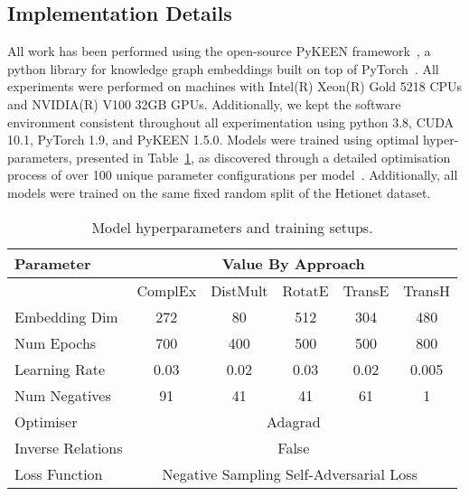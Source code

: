 \subsection{Implementation Details}

All work has been performed using the open-source PyKEEN framework~\cite{ali2020pykeen}, a python library for knowledge graph embeddings built on top of PyTorch~\cite{paszke2019pytorch}. All experiments were performed on machines with Intel(R) Xeon(R) Gold 5218 CPUs and NVIDIA(R) V100 32GB GPUs. Additionally, we kept the software environment consistent throughout all experimentation using python 3.8, CUDA 10.1, PyTorch 1.9, and PyKEEN 1.5.0. Models were trained using optimal hyper-parameters, presented in Table~\ref{tab:params}, as discovered through a detailed optimisation process of over 100 unique parameter configurations per model~\cite{bonner2021understanding}. Additionally, all models were trained on the same fixed random split of the Hetionet dataset.

\begin{table}[h!]
	\centering
	\small
	\begin{tabular}{l c c c c c }
		\toprule
		\textbf{Parameter} & \multicolumn{5}{c}{\textbf{Value By Approach}} \T\B                                                                      \\
		\midrule \midrule
		                   & ComplEx                                                                          & DistMult & RotatE & TransE & TransH\B \\
		\cline{2-6}

		Embedding Dim      & 272                                                                              & 80       & 512    & 304    & 480\T    \\
		Num Epochs         & 700                                                                              & 400      & 500    & 500    & 800      \\
		Learning Rate      & 0.03                                                                             & 0.02     & 0.03   & 0.02   & 0.005    \\
		Num Negatives      & 91                                                                               & 41       & 41     & 61     & 1        \\
		\midrule
		Optimiser          & \multicolumn{5}{c}{Adagrad}                                                                                              \\
		Inverse Relations  & \multicolumn{5}{c}{False}                                                                                                \\
		Loss Function      & \multicolumn{5}{c}{Negative Sampling Self-Adversarial Loss~\cite{sun2019rotate}}                                         \\
		\bottomrule
	\end{tabular}
	\caption{Model hyperparameters and training setups.}\label{tab:params}
\end{table}

